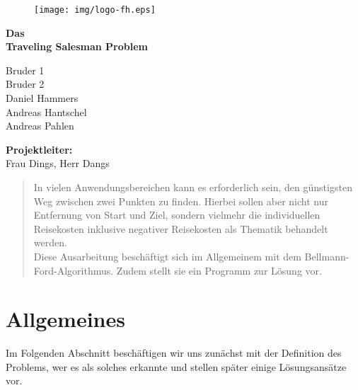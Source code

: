 \documentclass[a4paper]{article}
\begin{document}
		\begin{titlepage}
			\begin{center}
				\begin{figure}[h]
					\begin{center}
						\texttt{[image: img/logo-fh.eps]}
					\end{center}
				\end{figure}

				\vspace{150pt}
				\textbf{\Huge{Das \\ Traveling Salesman Problem}} \\ \vspace{30pt}
				\large				
				
				Bruder 1\\
				Bruder 2\\
				Daniel Hammers\\
				Andreas Hantschel\\
				Andreas Pahlen\\ \vspace{60pt}

				\textbf{Projektleiter:} \\
				Frau Dings, Herr Dangs
			\end{center}
			\thispagestyle{empty}
		\end{titlepage}
		
		\begin{abstract}
			In vielen Anwendungsbereichen kann es erforderlich sein, den günstigsten Weg zwischen zwei Punkten zu finden. Hierbei sollen aber nicht nur Entfernung von Start und Ziel, sondern vielmehr die individuellen Reisekosten inklusive negativer Reisekosten als Thematik behandelt werden.  \\
			
			Diese Ausarbeitung beschäftigt sich im Allgemeinem mit dem Bellmann-Ford-Algorithmus. Zudem stellt sie ein Programm zur Lösung vor.
		\end{abstract}
		\thispagestyle{empty}
		\newpage
		
		\tableofcontents
		\newpage
		
		\section{Allgemeines}
		Im Folgenden Abschnitt beschäftigen wir uns zunächst mit der Definition des Problems, wer es als solches erkannte und stellen später einige Lösungsansätze vor.
\end{document}
